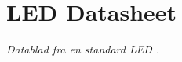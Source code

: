 \chapter[LED Datasheet]{LED Datasheet}
\label{paper-a}

\emph{Datablad fra en standard LED \cite{LEDdatasheet}.}
	
	\bigskip


